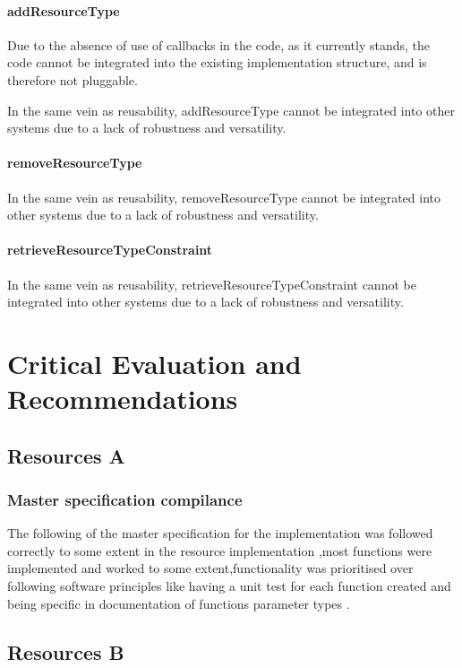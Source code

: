 \documentclass[a4paper]{article}
\begin{document}
\paragraph{addResourceType}

Due to the absence of use of callbacks in the code, as it currently stands, the code cannot be 
integrated into the existing implementation structure, and is therefore not pluggable.

In the same vein as reusability, addResourceType cannot be integrated into other systems due to a lack of robustness and versatility.

\paragraph{removeResourceType}
In the same vein as reusability, removeResourceType cannot be integrated into other systems due to a lack of robustness and versatility.

\paragraph{retrieveResourceTypeConstraint}
In the same vein as reusability, retrieveResourceTypeConstraint cannot be integrated into other systems due to a lack of robustness and versatility.



\section {Critical Evaluation and Recommendations}
\subsection {Resources A}
\subsubsection {Master specification compilance}
The following of the master specification for the implementation was followed correctly to some extent in the resource implementation ,most functions were implemented and worked to some extent,functionality was prioritised over following software principles like having a unit test for each function created and being specific in documentation of functions parameter types .

\subsection {Resources B}
\end{document}
